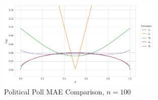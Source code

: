 \documentclass[11pt, letterpaper]{article}
\begin{document}
\begin{figure}[!h]
  \centering
  \includegraphics[width=0.7\textwidth]{3.d.2.png}
  \captionsetup{justification=centering}
  \caption{Political Poll MAE Comparison, $n = 100$}
\end{figure}
\end{document}
